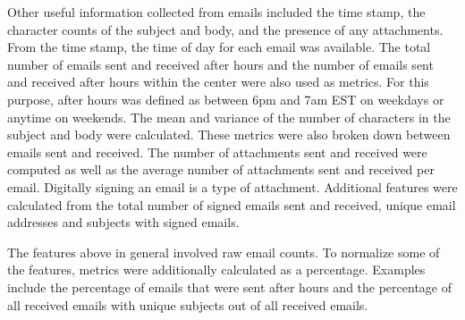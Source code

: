 \documentclass[10pt,twocolumn,conference]{IEEEtran}
\begin{document}
Other useful information collected from emails included the time stamp, the character counts of the subject and body, and the presence of any attachments. From the time stamp, the time of day for each email was available.  The total number of emails sent and received after hours and the number of emails sent and received after hours within the center were also used as metrics.  For this purpose, after hours was defined as between 6pm and 7am EST on weekdays or anytime on weekends.  The mean and variance of the number of characters in the subject and body were calculated.  These metrics were also broken down between emails sent and received.  The number of attachments sent and received were computed as well as the average number of attachments sent and received per email.  Digitally signing an email is a type of attachment.  Additional features were calculated from the total number of signed emails sent and received, unique email addresses and subjects with signed emails.

The features above in general involved raw email counts.  To normalize some of the features, metrics were additionally calculated as a percentage. Examples include the percentage of emails that were sent after hours and the percentage of all received emails with unique subjects out of all received emails.
\end{document}
